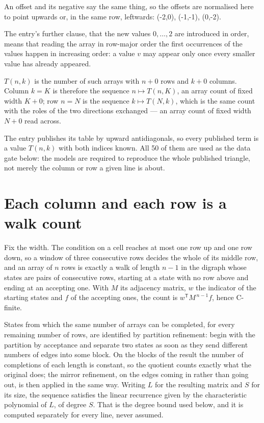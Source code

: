 \documentclass[11pt]{article}
\theoremstyle{definition}
\begin{document}
An offset and its negative say the same thing, so the offsets are normalised here to point upwards or, in the same row, leftwards: (-2,0), (-1,-1), (0,-2).

The entry's further clause, that the new values $0,\dots,2$ are introduced in order, means that reading the array in row-major order the first occurrences of the values happen in increasing order: a value $v$ may appear only once every smaller value has already appeared.

$T(n,k)$ is the number of such arrays with $n + 0$ rows and $k + 0$ columns. Column $k = K$ is therefore the sequence $n \mapsto T(n,K)$, an array count of fixed width $K + 0$; row $n = N$ is the sequence $k \mapsto T(N,k)$, which is the same count with the roles of the two directions exchanged --- an array count of fixed width $N + 0$ read across.

The entry publishes its table by upward antidiagonals, so every published term is a value $T(n,k)$ with both indices known. All 50 of them are used as the data gate below: the models are required to reproduce the whole published triangle, not merely the column or row a given line is about.

\section{Each column and each row is a walk count}

Fix the width. The condition on a cell reaches at most one row up and one row down, so a window of three consecutive rows decides the whole of its middle row, and an array of $n$ rows is exactly a walk of length $n-1$ in the digraph whose states are pairs of consecutive rows, starting at a state with no row above and ending at an accepting one. With $M$ its adjacency matrix, $w$ the indicator of the starting states and $f$ of the accepting ones, the count is $w^{\mathsf T}M^{\,n-1}f$, hence C-finite.

States from which the same number of arrays can be completed, for every remaining number of rows, are identified by partition refinement: begin with the partition by acceptance and separate two states as soon as they send different numbers of edges into some block. On the blocks of the result the number of completions of each length is constant, so the quotient counts exactly what the original does; the mirror refinement, on the edges coming in rather than going out, is then applied in the same way. Writing $L$ for the resulting matrix and $S$ for its size, the sequence satisfies the linear recurrence given by the characteristic polynomial of $L$, of degree $S$. That is the degree bound used below, and it is computed separately for every line, never assumed.
\end{document}
